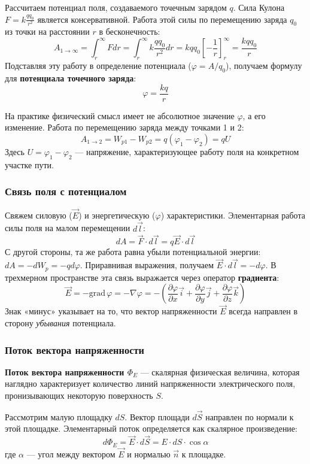 Рассчитаем потенциал поля, создаваемого точечным зарядом $q$. Сила Кулона $F = k \frac{qq_0}{r^2}$ является консервативной. Работа этой силы по перемещению заряда $q_0$ из точки на расстоянии $r$ в бесконечность:
\[
    A_{1 \to \infty} = \int_{r}^{\infty} F dr = \int_{r}^{\infty} k \frac{qq_0}{r^2} dr = kqq_0 \left[ -\frac{1}{r} \right]_{r}^{\infty} = \frac{kqq_0}{r}
\]
Подставляя эту работу в определение потенциала ($\varphi = A/q_0$), получаем формулу для \textbf{потенциала точечного заряда}:
\[
    \varphi = \frac{kq}{r}
\]

На практике физический смысл имеет не абсолютное значение $\varphi$, а его изменение. Работа по перемещению заряда между точками 1 и 2:
\[
    A_{1 \to 2} = W_{p1} - W_{p2} = q(\varphi_1 - \varphi_2) = qU
\]
Здесь $U = \varphi_1 - \varphi_2$ — напряжение, характеризующее работу поля на конкретном участке пути.

\subsubsection{Связь поля с потенциалом}

Свяжем силовую ($\vec{E}$) и энергетическую ($\varphi$) характеристики. Элементарная работа силы поля на малом перемещении $d\vec{l}$:
\[
    dA = \vec{F} \cdot d\vec{l} = q\vec{E} \cdot d\vec{l}
\]
С другой стороны, та же работа равна убыли потенциальной энергии: $dA = -dW_p = -q d\varphi$. Приравнивая выражения, получаем $\vec{E} \cdot d\vec{l} = -d\varphi$. В трехмерном пространстве эта связь выражается через оператор \textbf{градиента}:
\[
    \vec{E} = -\text{grad}\,\varphi = -\nabla\varphi = -\left( \frac{\partial\varphi}{\partial x}\vec{i} + \frac{\partial\varphi}{\partial y}\vec{j} + \frac{\partial\varphi}{\partial z}\vec{k}\right)
\]
Знак «минус» указывает на то, что вектор напряженности $\vec{E}$ всегда направлен в сторону \textit{убывания} потенциала.

\subsubsection{Поток вектора напряженности}

\textbf{Поток вектора напряженности $\Phi_E$} --- скалярная физическая величина, которая наглядно характеризует количество линий напряженности электрического поля, пронизывающих некоторую поверхность $S$.

Рассмотрим малую площадку $dS$. Вектор площади $d\vec{S}$ направлен по нормали к этой площадке. Элементарный поток определяется как скалярное произведение:
\[
    d\Phi_E = \vec{E} \cdot d\vec{S} = E \cdot dS \cdot \cos \alpha
\]
где $\alpha$ — угол между вектором $\vec{E}$ и нормалью $\vec{n}$ к площадке.

